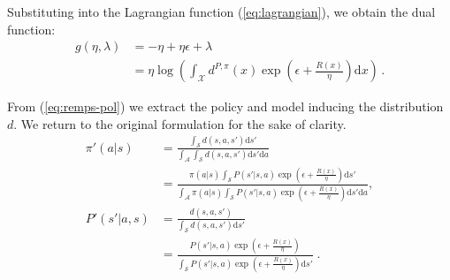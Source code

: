 Substituting into the Lagrangian function (\ref{eq:lagrangian}), we obtain the dual function:
\begin{align}
	g(\eta, \lambda) &= -\eta + \eta\epsilon + \lambda \\
	&= \eta \log \left( \int_\mathcal{X} d^{P,\pi}(x) \exp \left(\epsilon + \frac{R(x)}{\eta} \right)\mathrm{d}x \right) \, .
\end{align}

From (\ref{eq:remps-pol}) we extract the policy and model inducing the distribution $d$. We return to the original formulation for the sake of clarity.
\begin{align}
	\pi'(a | s) &= \frac{\int_\mathcal{S}d(s,a,s') \mathrm{d}s'}{\int_\mathcal{A}\int_\mathcal{S}d(s,a,s') \mathrm{d}s' \mathrm{d}a} \\
	&= \frac{\pi(a | s) \int_\mathcal{S} P(s' | s,a) \exp \left( \epsilon + \frac{R(x)}{\eta} \right) \mathrm{d}s'}{\int_\mathcal{A} \pi(a | s) \int_\mathcal{S} P(s'|s,a) \exp \left( \epsilon + \frac{R(x)}{\eta} \right) \mathrm{d}s' \mathrm{d}a}, \\
	P'(s' | a, s) &= \frac{d(s,a,s')}{\int_\mathcal{S}d(s,a,s') \mathrm{d}s'} \\
	&= \frac{P(s' | s,a) \exp \left( \epsilon + \frac{R(x)}{\eta} \right)}{\int_\mathcal{S} P(s' | s,a) \exp \left( \epsilon + \frac{R(x)}{\eta} \right) \mathrm{d}s'} \; .
\end{align}